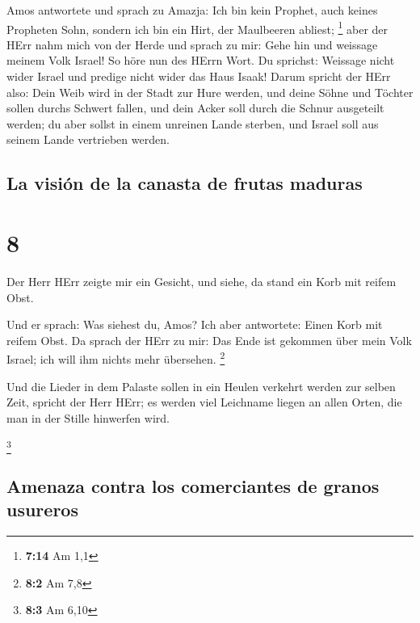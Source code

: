  Amos antwortete und sprach zu Amazja: Ich bin kein
Prophet, auch keines Propheten Sohn, sondern ich bin ein Hirt, der
Maulbeeren abliest; \footnote{\textbf{7:14} Am 1,1}  aber
der HErr nahm mich von der Herde und sprach zu mir: Gehe hin und
weissage meinem Volk Israel!  So höre nun des HErrn Wort.
Du sprichst: Weissage nicht wider Israel und predige nicht wider das
Haus Isaak!  Darum spricht der HErr also: Dein Weib wird
in der Stadt zur Hure werden, und deine Söhne und Töchter sollen durchs
Schwert fallen, und dein Acker soll durch die Schnur ausgeteilt werden;
du aber sollst in einem unreinen Lande sterben, und Israel soll aus
seinem Lande vertrieben werden.

\hypertarget{la-visiuxf3n-de-la-canasta-de-frutas-maduras}{%
\subsection{La visión de la canasta de frutas
maduras}\label{la-visiuxf3n-de-la-canasta-de-frutas-maduras}}

\hypertarget{section-7}{%
\section{8}\label{section-7}}

 Der Herr HErr zeigte mir ein Gesicht, und siehe, da stand
ein Korb mit reifem Obst.

 Und er sprach: Was siehest du, Amos? Ich aber antwortete:
Einen Korb mit reifem Obst. Da sprach der HErr zu mir: Das Ende ist
gekommen über mein Volk Israel; ich will ihm nichts mehr übersehen.
\footnote{\textbf{8:2} Am 7,8}

 Und die Lieder in dem Palaste sollen in ein Heulen
verkehrt werden zur selben Zeit, spricht der Herr HErr; es werden viel
Leichname liegen an allen Orten, die man in der Stille hinwerfen wird.

\footnote{\textbf{8:3} Am 6,10}

\hypertarget{amenaza-contra-los-comerciantes-de-granos-usureros}{%
\subsection{Amenaza contra los comerciantes de granos
usureros}\label{amenaza-contra-los-comerciantes-de-granos-usureros}}

